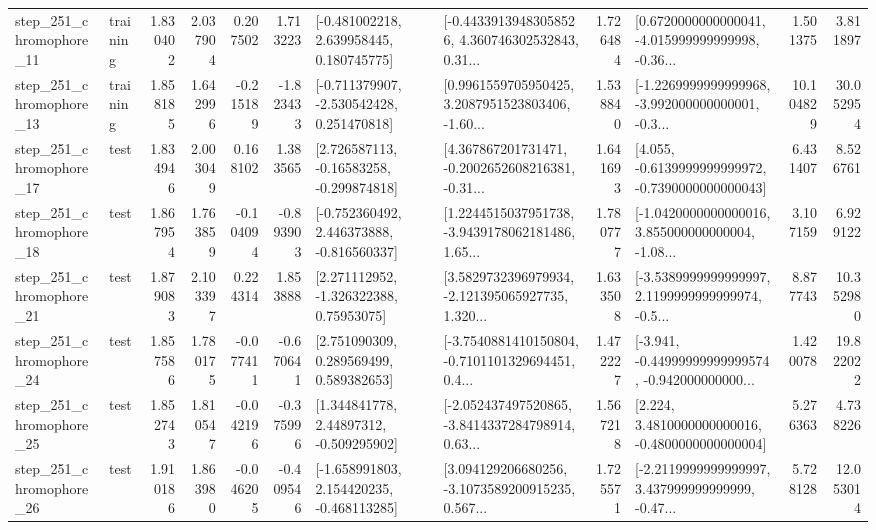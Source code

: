\begin{tabular}{llrrrrllrlrr}
  step\_251\_chromophore\_11 &  training &      1.830402 &    2.037904 &      0.207502 &  1.713223 &    [-0.481002218, 2.639958445, 0.180745775] &  [-0.44339139483058526, 4.360746302532843, 0.31... &       1.726484 &  [0.6720000000000041, -4.015999999999998, -0.36... &            1.501375 &          3.811897 \\
  step\_251\_chromophore\_13 &  training &      1.858185 &    1.642996 &     -0.215189 & -1.823433 &   [-0.711379907, -2.530542428, 0.251470818] &  [0.9961559705950425, 3.2087951523803406, -1.60... &       1.538840 &  [-1.2269999999999968, -3.992000000000001, -0.3... &           10.104829 &         30.052954 \\
  step\_251\_chromophore\_17 &      test &      1.834946 &    2.003049 &      0.168102 &  1.383565 &    [2.726587113, -0.16583258, -0.299874818] &  [4.367867201731471, -0.2002652608216381, -0.31... &       1.641693 &  [4.055, -0.6139999999999972, -0.7390000000000043] &            6.431407 &          8.526761 \\
  step\_251\_chromophore\_18 &      test &      1.867954 &    1.763859 &     -0.104094 & -0.893903 &   [-0.752360492, 2.446373888, -0.816560337] &  [1.2244515037951738, -3.9439178062181486, 1.65... &       1.780777 &  [-1.0420000000000016, 3.855000000000004, -1.08... &            3.107159 &          6.929122 \\
  step\_251\_chromophore\_21 &      test &      1.879083 &    2.103397 &      0.224314 &  1.853888 &     [2.271112952, -1.326322388, 0.75953075] &  [3.5829732396979934, -2.121395065927735, 1.320... &       1.633508 &  [-3.5389999999999997, 2.1199999999999974, -0.5... &            8.877743 &         10.352980 \\
  step\_251\_chromophore\_24 &      test &      1.857586 &    1.780175 &     -0.077411 & -0.670641 &     [2.751090309, 0.289569499, 0.589382653] &  [-3.7540881410150804, -0.7101101329694451, 0.4... &       1.472227 &  [-3.941, -0.44999999999999574, -0.942000000000... &            1.420078 &         19.822022 \\
  step\_251\_chromophore\_25 &      test &      1.852743 &    1.810547 &     -0.042196 & -0.375996 &     [1.344841778, 2.44897312, -0.509295902] &  [-2.052437497520865, -3.8414337284798914, 0.63... &       1.567218 &   [2.224, 3.4810000000000016, -0.4800000000000004] &            5.276363 &          4.738226 \\
  step\_251\_chromophore\_26 &      test &      1.910186 &    1.863980 &     -0.046205 & -0.409546 &   [-1.658991803, 2.154420235, -0.468113285] &  [3.094129206680256, -3.1073589200915235, 0.567... &       1.725571 &  [-2.2119999999999997, 3.437999999999999, -0.47... &            5.728128 &         12.053014 \\

\end{tabular}

